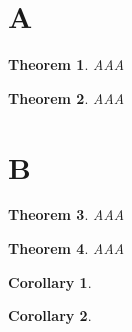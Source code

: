 \documentclass[12pt]{article}
\newtheorem{theorem}{Theorem}[section]
\newtheorem[section]{proposition}{Proposition}
\newtheorem{corollary}{Corollary}[theorem]
\begin{document}
\section{A}
\begin{theorem}
AAA
\end{theorem}

\begin{theorem}
AAA
\end{theorem}

\section{B}

\begin{theorem}
AAA
\end{theorem}

\begin{theorem}
AAA
\end{theorem}

\begin{corollary}

\end{corollary}

\begin{corollary}

\end{corollary}

\begin{proposition}

\end{proposition}
\end{document}
